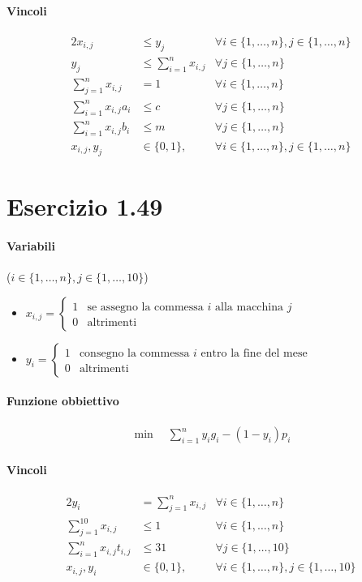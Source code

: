 \documentclass{article}
\begin{document}
\paragraph{Vincoli}
\begin{alignat}{2}
  x_{i,j} &\leq y_j &\forall i \in \{1,\ldots,n\}, j \in \{1,\ldots,n\}\\
  y_j &\leq \sum_{i=1}^n x_{i,j} &\forall j \in \{1,\ldots,n\}\\
  \sum_{j=1}^n x_{i,j} &= 1 &\forall i \in \{1,\ldots,n\} \\
  \sum_{i=1}^n x_{i,j} a_i &\leq c &\forall j \in \{1,\ldots,n\} \\
  \sum_{i=1}^n x_{i,j} b_i &\leq m &\forall j \in \{1,\ldots,n\} \\
  x_{i,j}, y_j &\in \{0,1\}, \quad &\forall i \in \{1,\ldots,n\}, j \in \{1,\ldots,n\}
\end{alignat}

\pagebreak
\section{Esercizio 1.49}

\paragraph{Variabili} ($i \in \{1,\ldots,n\}, j \in \{1,\ldots,10\}$)
\begin{itemize}
  \item $x_{i,j} = \begin{cases}
    1 &\text{se assegno la commessa }i\text{ alla macchina }j\\
    0 &\text{altrimenti}
  \end{cases}$
  \item $y_i = \begin{cases}
    1 &\text{consegno la commessa }i\text{ entro la fine del mese}\\
    0 &\text{altrimenti}
  \end{cases}$
\end{itemize}

\paragraph{Funzione obbiettivo}
\begin{align*}
  \min \quad \sum_{i=1}^n y_i g_i - (1-y_i)p_i
\end{align*}

\paragraph{Vincoli}
\begin{alignat}{2}
  y_i &= \sum_{j=1}^n x_{i,j} &\forall i \in \{1,\ldots,n\}\\
  \sum_{j=1}^10 x_{i,j} &\leq 1 &\forall i \in \{1,\ldots,n\}\\
  \sum_{i=1}^n x_{i,j} t_{i,j} &\leq 31 &\forall j \in \{1,\ldots,10\}\\
  x_{i,j}, y_i &\in \{0,1\}, \quad &\forall i \in \{1,\ldots,n\}, j \in \{1,\ldots,10\}
\end{alignat}
\end{document}
